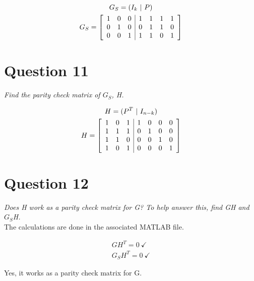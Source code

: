 \documentclass[12pt]{report}
\begin{document}
\begin{gather}
    G_S = (I_k\ |\ P) \\
    G_S =  
    \left[ \begin{array}{ c c c | c c c c }
        1 & 0 & 0 & 1 & 1 & 1 & 1 \\
        0 & 1 & 0 & 0 & 1 & 1 & 0 \\
        0 & 0 & 1 & 1 & 1 & 0 & 1 \\
    \end{array} \right]
\end{gather}

\section*{Question 11}
\textit{Find the parity check matrix of $G_S$, H.}

\begin{gather}
    H = (P^T\ |\ I_{n-k}) \\
    H = 
    \left[ \begin{array}{ c c c | c c c c }
        1 & 0 & 1 & 1 & 0 & 0 & 0 \\
        1 & 1 & 1 & 0 & 1 & 0 & 0 \\
        1 & 1 & 0 & 0 & 0 & 1 & 0 \\
        1 & 0 & 1 & 0 & 0 & 0 & 1 \\
    \end{array} \right]
\end{gather}

\section*{Question 12}
\textit{Does H work as a parity check matrix for G? To help answer this, find GH and $G_S$H.} \\

The calculations are done in the associated MATLAB file.

\begin{gather}
    GH^T = 0\ \checkmark \\
    G_SH^T = 0\ \checkmark
\end{gather}

Yes, it works as a parity check matrix for G.
\end{document}

